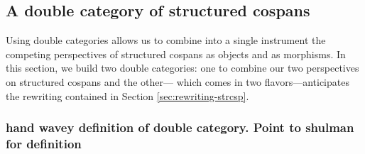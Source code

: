 \documentclass{amsart}
\theoremstyle{remark}
\theoremstyle{definition}
\begin{document}

\subsection{A double category of structured cospans}
\label{sec:DblCatOfStrCsp}

Using double categories allows us to combine into a single instrument the
competing perspectives of structured cospans as objects and as
morphisms. In this section, we build two double categories: one to
combine our two perspectives on structured cospans and the other---
which comes in two flavors---anticipates the rewriting contained in
Section \ref{sec:rewriting-strcsp}. 

\subsubsection{hand wavey definition of double category. Point to shulman for definition}
\label{sec-2-4-1}
\end{document}
